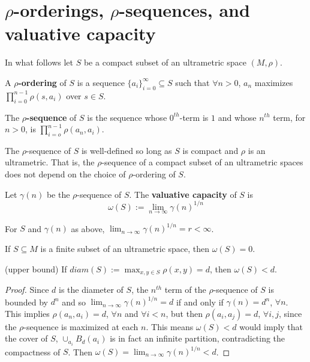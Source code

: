 \section*{$\rho$-orderings, $\rho$-sequences, and valuative capacity}

In what follows let $S$ be a compact subset of an ultrametric space $(M,\rho)$.

\begin{definition*}
	\cite{kj} A \textbf{$\rho$-ordering} of $S$ is a sequence $\{a_i\}_{i=0}^\infty \subseteq S$ such that $\forall n > 0$, $a_n$ maximizes $\prod_{i=0}^{n-1} \rho(s,a_i)$ over $s \in S$. 
\end{definition*}

\begin{definition*}
	\cite{kj} The \textbf{$\rho$-sequence} of $S$ is the sequence whose $0^{th}$-term is $1$ and whose $n^{th}$ term, for $n >0$, is $\prod_{i=o}^{n-1} \rho(a_n,a_i)$.
\end{definition*}

\begin{proposition*}
	\cite{kj} The $\rho$-sequence of $S$ is well-defined so long as $S$ is compact and $\rho$ is an ultrametric. That is, the $\rho$-sequence of a compact subset of an ultrametric spaces does not depend on the choice of $\rho$-ordering of $S$.
\end{proposition*}

\begin{definition*}
	\cite{kj}  Let $\gamma(n)$ be the $\rho$-sequence of $S$. The \textbf{valuative capacity} of $S$ is \[\omega(S)
	:= \lim_{n\to\infty} \gamma(n)^{1/n}\]  
\end{definition*}


\begin{proposition*}
	\cite{kj} For $S$ and $\gamma(n)$ as above,  $\lim_{n\to\infty} \gamma(n)^{1/n} = r < \infty$. 
\end{proposition*}


\begin{proposition*}
	If $S \subseteq M$ is a finite subset of an ultrametric space, then $\omega(S) =0$.
\end{proposition*}


\begin{proposition*}
	(upper bound) If $diam(S)  := \max_{x,y \in S} \rho(x,y)= d$, then $\omega(S) < d$.
\end{proposition*}

\begin{proof}
	Since $d$ is the diameter of $S$, the $n^{th}$ term of the $\rho$-sequence of $S$ is bounded by $d^n$ and so $ \lim_{n\to\infty} \gamma(n)^{1/n}=d$ if and only if $\gamma(n)=d^n$, $\forall n$. This implies $\rho(a_n, a_i) = d$, $\forall n$ and $\forall i < n$, but then $\rho(a_i,a_j)=d$, $\forall i,j$, since the $\rho$-sequence is maximized at each $n$. This means $\omega(S) < d$ would imply that the cover of $S$, $\cup_{a_i} B_d(a_i)$ is in fact an infinite partition, contradicting the compactness of $S$. Then  $\omega(S)= \lim_{n\to\infty} \gamma(n)^{1/n}<d$. 
\end{proof}



